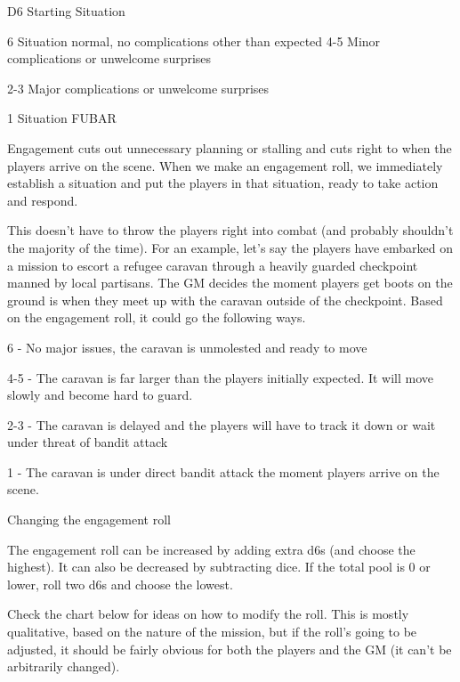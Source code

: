  D6                                                    Starting Situation

 6                                                     Situation normal, no complications other than
                                                       expected
 4-5                                                   Minor complications or unwelcome surprises

 2-3                                                   Major complications or unwelcome surprises

 1                                                     Situation FUBAR

Engagement cuts out unnecessary planning or stalling and cuts right to when the players arrive
on the scene. When we make an engagement roll, we immediately establish a situation and put
the players in that situation, ready to take action and respond.


This doesn’t have to throw the players right into combat (and probably shouldn’t the majority of
the time). For an example, let’s say the players have embarked on a mission to escort a refugee
caravan through a heavily guarded checkpoint manned by local partisans. The GM decides the
moment players get boots on the ground is when they meet up with the caravan outside of the
checkpoint. Based on the engagement roll, it could go the following ways.


6 - No major issues, the caravan is unmolested and ready to move

4-5 - The caravan is far larger than the players initially expected. It will move slowly and become
hard to guard.

2-3 - The caravan is delayed and the players will have to track it down or wait under threat of
bandit attack

1 - The caravan is under direct bandit attack the moment players arrive on the scene.


                                    Changing the engagement roll


The engagement roll can be increased by adding extra d6s (and choose the highest). It can also
be decreased by subtracting dice. If the total pool is 0 or lower, roll two d6s and choose the
lowest.


Check the chart below for ideas on how to modify the roll. This is mostly qualitative, based on
the nature of the mission, but if the roll’s going to be adjusted, it should be fairly obvious for both
the players and the GM (it can’t be arbitrarily changed).


